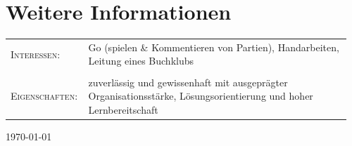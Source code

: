 \documentclass[a4paper,10pt]{article} %
\begin{document}
%
%


\section{Weitere Informationen}

\begin{tabular}{R{0.2\linewidth}p{0.76\linewidth}}
	\textsc{Interessen:} & Go (spielen \& Kommentieren von Partien), Handarbeiten, Leitung eines Buchklubs\\
	&\\
	\textsc{Eigenschaften:} & zuverlässig und gewissenhaft mit ausgeprägter Organisationsstärke, Lösungsorientierung und hoher Lernbereitschaft
\end{tabular}
\vspace{1em}
{
\vspace{2em}
\hfill \today}

\newpage





\end{document}
